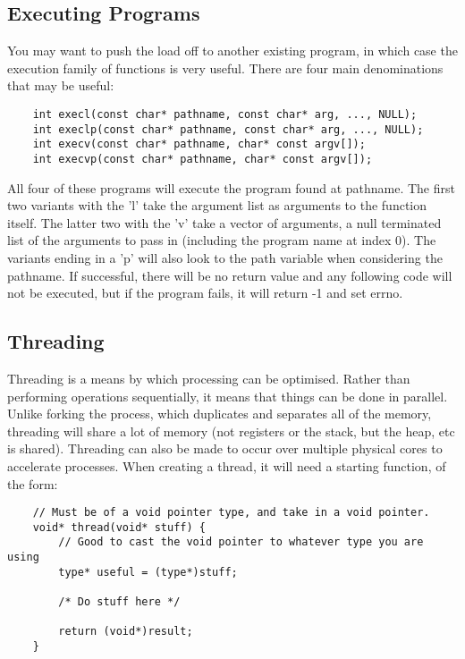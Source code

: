 \documentclass{article}
\begin{document}
\subsection{Executing Programs}
You may want to push the load off to another existing program, in which case the execution family of functions is very useful. There are four main denominations that may be useful:
\begin{verbatim}
    int execl(const char* pathname, const char* arg, ..., NULL);
    int execlp(const char* pathname, const char* arg, ..., NULL);
    int execv(const char* pathname, char* const argv[]);
    int execvp(const char* pathname, char* const argv[]);
\end{verbatim}
All four of these programs will execute the program found at pathname. The first two variants with the 'l' take the argument list as arguments to the function itself. The latter two with the 'v' take a vector of arguments, a null terminated list of the arguments to pass in (including the program name at index 0). The variants ending in a 'p' will also look to the path variable when considering the pathname. If successful, there will be no return value and any following code will not be executed, but if the program fails, it will return -1 and set errno.

\subsection{Threading}
Threading is a means by which processing can be optimised. Rather than performing operations sequentially, it means that things can be done in parallel. Unlike forking the process, which duplicates and separates all of the memory, threading will share a lot of memory (not registers or the stack, but the heap, etc is shared). Threading can also be made to occur over multiple physical cores to accelerate processes. When creating a thread, it will need a starting function, of the form:
\begin{verbatim}
    // Must be of a void pointer type, and take in a void pointer.
    void* thread(void* stuff) {
        // Good to cast the void pointer to whatever type you are using
        type* useful = (type*)stuff;
        
        /* Do stuff here */

        return (void*)result;
    }
\end{verbatim}
\end{document}
